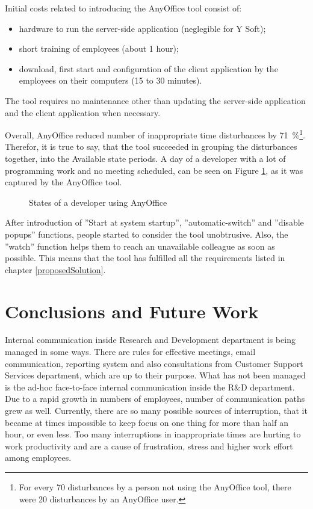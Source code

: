 \documentclass[11pt,singleside]{myfithesis2}
\newcommand{\pict}[4]{
	\begin{figure}[h!]
  		\vspace{-7px}
  		\centerline{\fcolorbox{darkgray}{palegray}{\texttt{[image: \#2]}}}
  		\caption{#1}
  		\label{#4}
	\end{figure}
}
\begin{document}
Initial costs related to introducing the AnyOffice tool consist of:
\begin{itemize}
	\item{hardware to run the server-side application (neglegible for Y Soft);}
	\item{short training of employees (about 1 hour);}
	\item{download, first start and configuration of the client application by the employees on their computers (15 to 30 minutes).}
\end{itemize}
The tool requires no maintenance other than updating the server-side application and the client application when necessary. 

Overall, AnyOffice reduced number of inappropriate time disturbances by 71~\%\footnote{For every 70 disturbances by a person not using the AnyOffice tool, there were 20 disturbances by an AnyOffice user.}. Therefor, it is true to say, that the tool succeeded in grouping the disturbances together, into the Available state periods. A day of a developer with a lot of programming work and no meeting scheduled, can be seen on Figure \ref{pic:anyOfficeStatesFinal}, as it was captured by the AnyOffice tool.

\pict{States of a developer using AnyOffice}{data/anyOfficeStatesFinal.png}{width=1\textwidth}{pic:anyOfficeStatesFinal}

After introduction of ''Start at system startup'', ''automatic-switch'' and ''disable popups'' functions, people started to consider the tool unobtrusive. Also, the ''watch'' function helps them to reach an unavailable colleague as soon as possible. This means that the tool has fulfilled all the requirements listed in chapter \ref{proposedSolution}.


\chapter{Conclusions and Future Work}
Internal communication inside Research and Development department is being managed in some ways. There are rules for effective meetings, email communication, reporting system and also consultations from Customer Support Services department, which are up to their purpose. What has not been managed is the ad-hoc face-to-face internal communication inside the R\&D department. Due to a rapid growth in numbers of employees, number of communication paths grew as well. Currently, there are so many possible sources of interruption, that it became at times impossible to keep focus on one thing for more than half an hour, or even less. Too many interruptions in inappropriate times are hurting to work productivity and are a cause of frustration, stress and higher work effort among employees.
\end{document}
